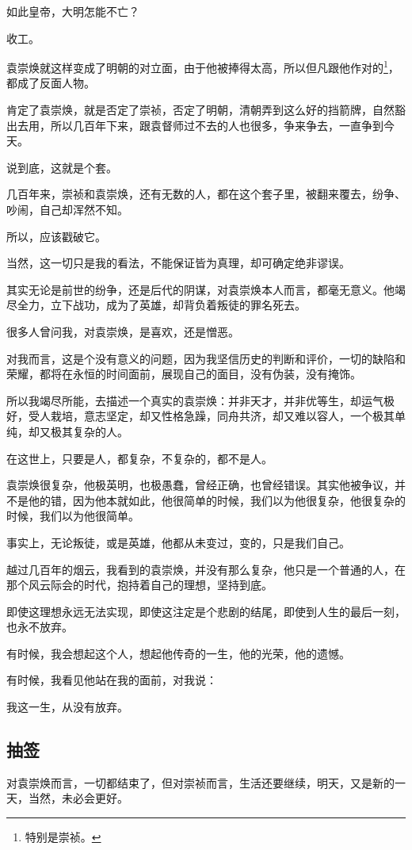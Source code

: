 \begin{multicols}{\theparacolNo}
		如此皇帝，大明怎能不亡？

		收工。

		袁崇焕就这样变成了明朝的对立面，由于他被捧得太高，所以但凡跟他作对的\footnote{特别是崇祯。}，都成了反面人物。

		肯定了袁崇焕，就是否定了崇祯，否定了明朝，清朝弄到这么好的挡箭牌，自然豁出去用，所以几百年下来，跟袁督师过不去的人也很多，争来争去，一直争到今天。

		说到底，这就是个套。

		几百年来，崇祯和袁崇焕，还有无数的人，都在这个套子里，被翻来覆去，纷争、吵闹，自己却浑然不知。

		所以，应该戳破它。

		当然，这一切只是我的看法，不能保证皆为真理，却可确定绝非谬误。

		其实无论是前世的纷争，还是后代的阴谋，对袁崇焕本人而言，都毫无意义。他竭尽全力，立下战功，成为了英雄，却背负着叛徒的罪名死去。

		很多人曾问我，对袁崇焕，是喜欢，还是憎恶。

		对我而言，这是个没有意义的问题，因为我坚信历史的判断和评价，一切的缺陷和荣耀，都将在永恒的时间面前，展现自己的面目，没有伪装，没有掩饰。

		所以我竭尽所能，去描述一个真实的袁崇焕：并非天才，并非优等生，却运气极好，受人栽培，意志坚定，却又性格急躁，同舟共济，却又难以容人，一个极其单纯，却又极其复杂的人。

		在这世上，只要是人，都复杂，不复杂的，都不是人。

		袁崇焕很复杂，他极英明，也极愚蠢，曾经正确，也曾经错误。其实他被争议，并不是他的错，因为他本就如此，他很简单的时候，我们以为他很复杂，他很复杂的时候，我们以为他很简单。

		事实上，无论叛徒，或是英雄，他都从未变过，变的，只是我们自己。

		越过几百年的烟云，我看到的袁崇焕，并没有那么复杂，他只是一个普通的人，在那个风云际会的时代，抱持着自己的理想，坚持到底。

		即使这理想永远无法实现，即使这注定是个悲剧的结尾，即使到人生的最后一刻，也永不放弃。

		有时候，我会想起这个人，想起他传奇的一生，他的光荣，他的遗憾。

		有时候，我看见他站在我的面前，对我说：

		我这一生，从没有放弃。

		\subsection{抽签}
		对袁崇焕而言，一切都结束了，但对崇祯而言，生活还要继续，明天，又是新的一天，当然，未必会更好。


\end{multicols}
